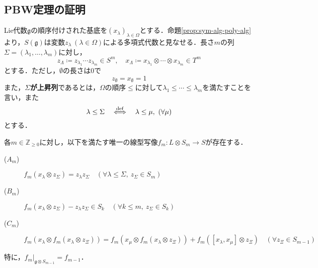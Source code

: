 \documentclass[rep_main]{subfiles}
\begin{document}
\subsection{PBW定理の証明}
Lie代数$\mathfrak{g}$の順序付けされた基底を$(x_\lambda)_{\lambda \in \Omega}$とする．命題\ref{prop:sym-alg-poly-alg}より，$S(\mathfrak{g})$は変数$z_\lambda\ (\lambda \in \Omega)$による多項式代数と見なせる．長さ$m$の列$\Sigma = (\lambda_1, \ldots, \lambda_m)$に対し，
\begin{equation}
	z_\Lambda \coloneqq z_{\lambda_1}\cdots z_{\lambda_m} \in S^m,\quad  x_\Lambda \coloneqq x_{\lambda_1}\otimes\cdots\otimes x_{\lambda_m} \in T^m
\end{equation}
とする．ただし，$\emptyset$の長さは$0$で
\begin{equation}
	z_\emptyset = x_\emptyset = 1
\end{equation}
また，\textbf{$\Sigma$が上昇列}であるとは，$\Omega$の順序$\leq$に対して$\lambda_1 \leq \cdots \leq \lambda_m$を満たすことを言い，また
\begin{equation}
	\lambda \leq \Sigma  \quad\stackrel{\mathrm{def}}{\Longleftrightarrow}\quad  \lambda \leq \mu,\ (\forall \mu)
\end{equation}
とする．
\begin{mylem}[label=lem:PBW-proof-A]{}
	各$m \in \mathbb{Z}_{\geq0}$に対し，以下を満たす唯一の線型写像$f_m\colon L \otimes S_m \to S$が存在する．
	\begin{description}
		\item[($A_m$)] $f_m(x_\lambda \otimes z_{\Sigma}) = z_\lambda z_\Sigma\quad  (\forall \lambda \leq \Sigma,\ z_\Sigma \in S_m)$
		\item[($B_m$)] $f_m(x_\lambda \otimes z_{\Sigma}) - z_\lambda z_\Sigma \in S_k\quad  (\forall k \leq m,\ z_\Sigma \in S_k)$
		\item[($C_m$)] $f_m(x_\lambda \otimes f_m(x_\lambda \otimes z_\Xi)) = f_m(x_\mu \otimes f_m(x_\lambda \otimes z_\Xi)) + f_m([x_\lambda, x_\mu] \otimes z_\Xi)\quad  (\forall z_\Xi \in S_{m-1})$
	\end{description}
	特に，$f_m|_{\mathfrak{g} \otimes S_{m-1}} = f_{m-1}$．
\end{mylem}
\end{document}
